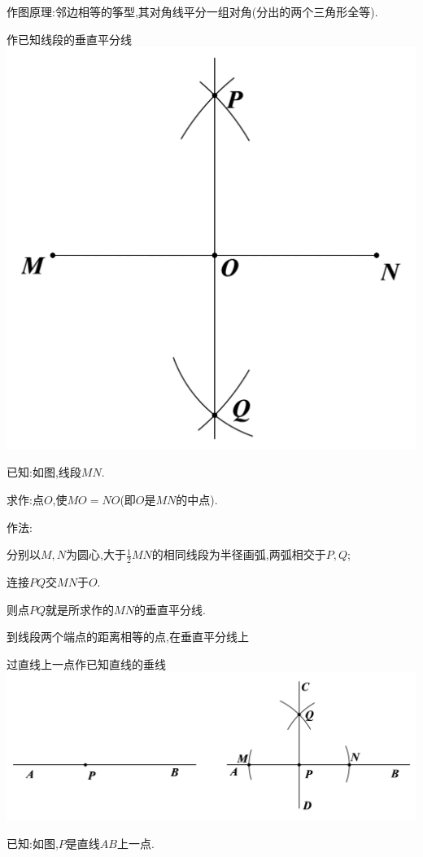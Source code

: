 \documentclass[cn,blue,12pt]{elegantbook}
\begin{document}
\begin{zsyd}
\begin{zsyd}
\begin{note}
            作图原理:邻边相等的筝型,其对角线平分一组对角(分出的两个三角形全等).
\end{note}
    \item 作已知线段的垂直平分线\\
        \includegraphics[width=0.4\linewidth]{pic/20200515006.png}\\
        \begin{zsyd}
        \item 已知:如图,线段\(MN\).
        \item 求作:点\(O\),使\(MO=NO\)(即\(O\)是\(MN\)的中点).
        \item 作法:
            \begin{zsyd}
            \item 分别以\(M,N\)为圆心,大于\(\frac{1}{2}MN\)的相同线段为半径画弧,两弧相交于\(P,Q\);
            \item 连接\(PQ\)交\(MN\)于\(O\).
            \item 则点\(PQ\)就是所求作的\(MN\)的垂直平分线.
            \end{zsyd}
        \end{zsyd}
\begin{note}
            到线段两个端点的距离相等的点,在垂直平分线上
\end{note}
    \item 过直线上一点作已知直线的垂线\\
        \includegraphics[width=0.8\linewidth]{pic/20200515014.png}\\
        \begin{zsyd}
        \item 已知:如图,\(P\)是直线\(AB\)上一点.

\end{zsyd}
\end{zsyd}
\end{zsyd}
\end{document}
